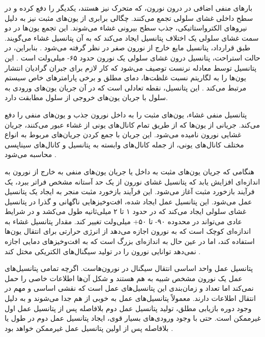 بارهای منفی اضافی در درون نورون، که متحرک نیز هستند، یکدیگر را دفع کرده و در سطح داخلی غشای سلولی تجمع می‌کنند.
چگالی برابری از یون‌های مثبت نیز به دلیل نیروهای الکترواستاتیکی، جذب سطح بیرونی غشاء می‌شوند.
این تجمع یون‌ها در دو سمت غشای سلولی یک اختلاف پتانسیل ایجاد می‌کند که به آن پتانسیل غشاء می‌گویند.
طبق قرارداد، پتانسیل مایع خارج از نورون صفر در نظر گرفته می‌شود
\cite{dayan2001}.
بنابراین، در حالت استراحت، پتانسیل درون غشای سلولی یک نورون حدود ۶۵- میلی‌ولت است
\cite{gerstner2002}.
این پتانسیل توسط معادله نرنست توصیف می‌شود که کار لازم برای جبران گرادیان انتشار یون‌ها را به لگاریتم نسبت غلظت‌ها، دمای مطلق و برخی پارامترهای خاص سیستم مرتبط می‌کند
\cite{feiner1994}.
این پتانسیل، نقطه تعادلی است که در آن جریان یون‌های ورودی به سلول با جریان یون‌های خروجی از سلول مطابقت دارد.

پتانسیل منفی غشاء، یون‌های مثبت را به داخل نورون جذب و یون‌های منفی را دفع می‌کند.
جریانی از یون‌ها که از طریق تمام کانال‌های یونی از غشاء عبور می‌کنند، جریان غشایی نورون نامیده می‌شود.
این جریان با جمع کردن جریان‌های مربوط به انواع مختلف کانال‌های یونی، از جمله کانال‌های وابسته به پتانسیل و کانال‌های سیناپسی محاسبه می‌شود
\cite{dayan2001}.

هنگامی که جریان یون‌های مثبت به داخل یا جریان یون‌های منفی به خارج از نورون به اندازه‌ای افزایش یابد که پتانسیل غشای نورون از یک حد آستانه مشخص فراتر ببرد، یک فرآیند بازخورد مثبت آغاز می‌شود.
این فرآیند بازخورد مثبت منجر به ایجاد یک پتانسیل عمل می‌شود.
این پتانسیل عمل ایجاد شده، افت‌وخیزهایی ناگهانی و گذرا در پتانسیل غشای سلولی ایجاد می‌کند که در حدود ۱ تا ۲ میلی‌ثانیه طول می‌کشد و در شرایط عادی می‌تواند در محدوده ۹۰- تا ۵۰+ میلی‌ولت تغییر کند.
مقدار پتانسیل غشاء به اندازه‌ای کوچک است که به نورون اجازه می‌دهد از انرژی حرارتی برای انتقال یون‌ها استفاده کند، اما در عین حال به اندازه‌ای بزرگ است که به افت‌وخیزهای دمایی اجازه نمی‌دهد توانایی نورون را در تولید سیگنال‌های الکتریکی مختل کند
\cite{dayan2001}.

پتانسیل عمل واحد اساسی انتقال سیگنال در نورون‌هاست.
اگرچه تمامی پتانسیل‌های عمل یک نورون مشخص شبیه به هم هستند و شکل آن‌ها اطلاعات خاصی را حمل نمی‌کند اما تعداد و زمان‌بندی این پتانسیل‌های عمل است که نقشی اساسی و مهم در انتقال اطلاعات دارند.
معمولاً پتانسیل‌های عمل به خوبی از هم جدا می‌شوند و به دلیل وجود دوره بازیابی مطلق، تولید پتانسیل عمل دوم بلافاصله پس از پتانسیل عمل اول غیرممکن است.
حتی با وجود ورودی‌های بسیار قوی، ایجاد پتانسیل عمل دوم در طول یا بلافاصله پس از اولین پتانسیل عمل غیرممکن خواهد بود
\cite{gerstner2002}.

